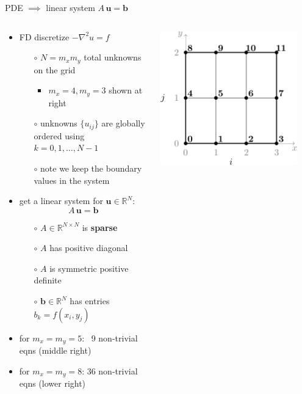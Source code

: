 \documentclass[10pt,
               svgnames,
               hyperref={colorlinks,citecolor=DeepPink4,linkcolor=FireBrick,urlcolor=Maroon},
               usepdftitle=false]{beamer}
\newcommand{\bb}{\mathbf{b}}
\newcommand{\bu}{\mathbf{u}}
\newcommand{\RR}{\mathbb{R}}
\newcommand{\grad}{\nabla}
\begin{document}
\begin{frame}{PDE $\implies$ linear system $A\,\bu=\bb$}
\begin{columns}
\begin{column}{0.73\textwidth}
\begin{itemize}
\item FD discretize $-\grad^2 u = f$

	\begin{itemize}
	\item[$\circ$] $N=m_x m_y$ total unknowns on the grid
	    \begin{itemize}
	    \item $m_x=4,m_y=3$ shown at right
        \end{itemize}
	\item[$\circ$] unknowns $\{u_{ij}\}$ are globally ordered using $k=0,1,\dots,N-1$
	\item[$\circ$] note we keep the boundary values in the system
	\end{itemize}
\item get a linear system for $\bu \in \RR^N$:
	$$A\, \bu = \bb$$

	\begin{itemize}
	\item[$\circ$] $A \in \RR^{N\times N}$ is \textbf{sparse}
	\item[$\circ$] $A$ has positive diagonal
	\item[$\circ$] $A$ is symmetric positive definite
	\item[$\circ$] $\bb \in \RR^N$ has entries $b_k = f(x_i,y_j)$
	\end{itemize}
\item for $m_x=m_y=5$: \,\,\,9 non-trivial eqns (middle right)
\item for $m_x=m_y=8$: 36 non-trivial eqns (lower right)
\end{itemize}
\end{column}
\begin{column}{0.27\textwidth}
\hfill \includegraphics[width=0.9\textwidth]{images/gridordering.png}


\end{column}
\end{columns}
\end{frame}
\end{document}
